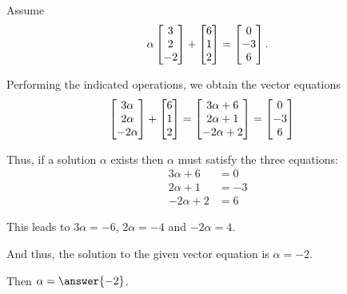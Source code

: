 \documentclass{ximera}
\author{Chris Black}
\begin{document}
\begin{exercise}
  Assume
  \[
    \alpha\begin{bmatrix}3\\2\\-2\end{bmatrix}+
    \begin{bmatrix}6\\1\\2\end{bmatrix}
    =
    \begin{bmatrix}0\\-3\\6\end{bmatrix}.
  \]

  \begin{hint}
    Performing the indicated operations, we obtain the vector equations
    \begin{align*}
      \begin{bmatrix}3\alpha \\ 2\alpha\\ - 2\alpha\end{bmatrix} + \begin{bmatrix}6\\1\\2\end{bmatrix}
   &= \begin{bmatrix}3\alpha + 6 \\ 2\alpha + 1\\ -2\alpha + 2\end{bmatrix}
      = \begin{bmatrix}0\\-3\\6\end{bmatrix}
    \end{align*}
  \end{hint}

  \begin{hint}
    Thus, if a solution $\alpha$ exists then $\alpha$ must satisfy the three equations:
    \begin{align*}
      3\alpha + 6 &= 0\\
      2\alpha + 1 &= -3\\
      -2 \alpha + 2 &= 6
    \end{align*}
  \end{hint}

  \begin{hint}
    This leads to $3\alpha = -6$, $2\alpha = -4$ and $-2\alpha = 4$.
  \end{hint}
  
  \begin{hint}  
    And thus, the solution to the given vector equation is $\alpha = -2$.
  \end{hint}

  Then $\alpha = \answer{-2}$.

\end{exercise}
\end{document}
